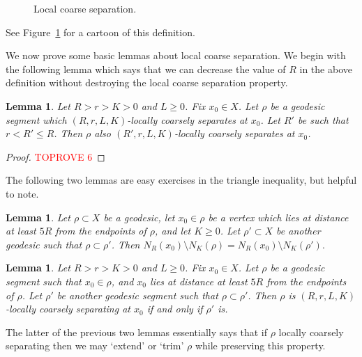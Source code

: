 \documentclass[10pt,a4paper]{amsart}
\newtheorem{lemma}[theorem]{Lemma}
\theoremstyle{definition}
\begin{document}
\begin{figure}[t]
\begin{tikzpicture}[x=0.75pt,y=0.75pt,yscale=-1,xscale=1]
\end{tikzpicture}

    \caption{Local coarse separation.}
    \label{fig:lcs}
\end{figure}

See Figure~\ref{fig:lcs} for a cartoon of this definition. 

We now prove some basic lemmas about local coarse separation. 
We begin with the following lemma which says that we can decrease the value of $R$ in the above definition without destroying the local coarse separation property. 

\begin{lemma}\label{lem:shrink-R}
    Let $R >  r > K > 0$ and $L \geq 0$. Fix $x_0 \in X$. Let $\rho$ be a geodesic segment which $(R,r, L, K)$-locally coarsely separates at $x_0$. Let $R'$ be such that $r < R' \leq R$. 
Then $\rho$ also $(R',r, L, K)$-locally coarsely separates at $x_0$. 
\end{lemma}

\begin{proof}\textcolor{red}{TOPROVE 6}\end{proof}


The following two lemmas are easy exercises in the triangle inequality, but helpful to note. 


\begin{lemma}\label{lem:complement-agrees}
    Let $\rho \subset X$ be a geodesic, let $x_0 \in \rho$ be a vertex which lies at distance at least $5R$ from the endpoints of $\rho$, and let $K \geq 0$. 
    Let $\rho' \subset X$ be another geodesic such that $\rho \subset \rho'$. Then 
    $
    N_R(x_0) \setminus N_K(\rho) = N_R(x_0) \setminus N_K(\rho'). 
    $
\end{lemma}




\begin{lemma}\label{lem:trim-grow}
    Let $R >  r > K > 0$ and $L \geq 0$. Fix $x_0 \in X$. Let $\rho$ be a geodesic segment such that $x_0 \in \rho$, and $x_0$ lies at distance at least $5R$ from the endpoints of $\rho$. Let $\rho'$ be another geodesic segment such that $\rho \subset \rho'$. 
Then $\rho$ is $(R,r, L, K)$-locally coarsely separating at $x_0$ if and only if $\rho'$ is. 
\end{lemma}


The latter of the previous two lemmas essentially says that if $\rho$ locally coarsely separating then we may `extend' or `trim' $\rho$ while preserving this property. 
\end{document}
